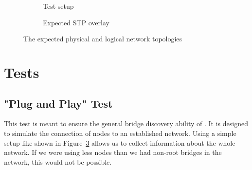 \begin{figure}[h]
    \begin{center}
        \begin{subfigure}[b]{0.4\textwidth}
            \caption{Test setup}
            \label{fig:test_setup}
        \end{subfigure}
        \hspace{1cm}
        \begin{subfigure}[b]{0.4\textwidth}
            \centering
            \caption{Expected STP overlay}
            \label{fig:test_setup}
        \end{subfigure}
    \end{center}
    \caption{The expected physical and logical network topologies}
\end{figure}

\section{Tests}
\subsection*{"Plug and Play" Test}
\label{usage_test}
This test is meant to ensure the general bridge discovery ability of \tool.
It is designed to simulate the connection of nodes to an established network.
Using a simple setup like shown in Figure~\ref{fig:test_setup} allows us to collect information about the whole network.
If we were using less nodes than we had non-root bridges in the network, this would not be possible.

